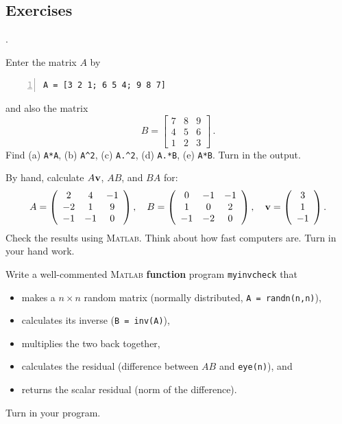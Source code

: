 \subsection*{Exercises}
\begin{list}
{.}{}


\item Enter the matrix $A$ by
\begin{lstlisting}[frame=none,numbers=left]
A = [3 2 1; 6 5 4; 9 8 7]
\end{lstlisting}
and also the matrix
$$
B = \left[
{\begin{array}{rrr}
7 & 8 & 9 \\
4 & 5 & 6 \\
1 & 2 & 3 
\end{array}}
\right]\,.  $$
Find  (a) \verb&A*A&, (b) \verb&A^2&, (c) \verb&A.^2&, (d) \verb&A.*B&, (e) \verb&A*B&. Turn in the output.

\item By hand, calculate $A \mathbf{v}$, $AB$, and $BA$ for:
      $$
        A = \left( \begin{array}{ccc}
                    2 & 4 & -1 \\
                    -2 & 1 & 9 \\
                    -1 & -1 & 0 \\
                   \end{array} \right),
        \quad
        B = \left( \begin{array}{ccc}
                    0 & -1 & -1 \\
                    1 & 0 & 2 \\
                    -1 & -2 & 0 \\
                   \end{array} \right),
        \quad
        \mathbf{v} = \left( \begin{array}{c}
                    3  \\
                    1  \\
                    -1 \\
                   \end{array} \right).
     $$
     Check the results using \textsc{Matlab}. Think about how
     fast computers are. Turn in your hand work.

\item  Write a well-commented \textsc{Matlab} {\bf function} program
    \verb&myinvcheck& that
    \begin{itemize}
    \item makes a $n \times n$ random matrix (normally distributed,
      \verb&A = randn(n,n)&),
    \item calculates its inverse (\verb&B = inv(A)&),
    \item multiplies the two back together,
    \item calculates the residual (difference between $AB$ and \verb&eye(n)&), and
    \item returns the scalar residual (norm of the difference).
    \end{itemize}
    Turn in your program.
  

\end{list}
